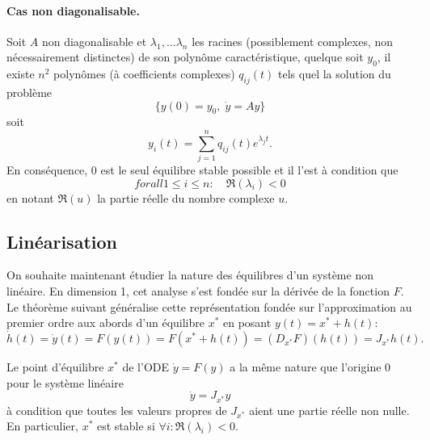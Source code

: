 \paragraph*{Cas non diagonalisable.}

\begin{theorem*}
  Soit $A$ non diagonalisable et $\lambda_1, \dots \lambda_n$ les racines (possiblement complexes, non nécessairement distinctes) de son polynôme caractéristique, quelque soit $y_0$, il existe $n^2$ polynômes (à coefficients complexes) $q_{ij}(t)$ tels quel la solution du problème
  $$
  \{y(0) = y_0, \; \dot y = A y\}
  $$
  soit
  $$
  y_i(t) = \sum_{j=1}^n q_{ij}(t) e^{\lambda_j t}.
  $$
  En conséquence, 0 est le seul équilibre stable possible et il l'est à condition que
  $$
  forall 1 \leq i \leq n: \quad \Re(\lambda_i) < 0
  $$
  en notant $\Re(u)$ la partie réelle du nombre complexe $u$.
\end{theorem*}

\subsection{Linéarisation} 

On souhaite maintenant étudier la nature des équilibres d'un système non linéaire. En dimension 1, cet analyse s'est fondée sur la dérivée de la fonction $F$. Le théorème suivant généralise cette représentation fondée sur l'approximation au premier ordre aux abords d'un équilibre $x^*$ en posant $y(t) = x^* + h(t)$: 
$$
\dot h(t) = \dot y (t) = F(y(t)) = F(x^* + h(t)) = (D_{x^*} F)(h(t)) = J_{x^*} h(t).
$$

\begin{theorem*}
  Le point d'équilibre $x^*$ de l'ODE $\dot y = F(y)$ a la même nature que l'origine $0$ pour le système linéaire 
  $$
  \dot y = J_{x^*} y
  $$
  à condition que toutes les valeurs propres de $J_{x^*}$ aient une partie réelle non nulle. \\
  En particulier, $x^*$ est stable si $\forall i: \Re(\lambda_i) < 0$.
\end{theorem*}

